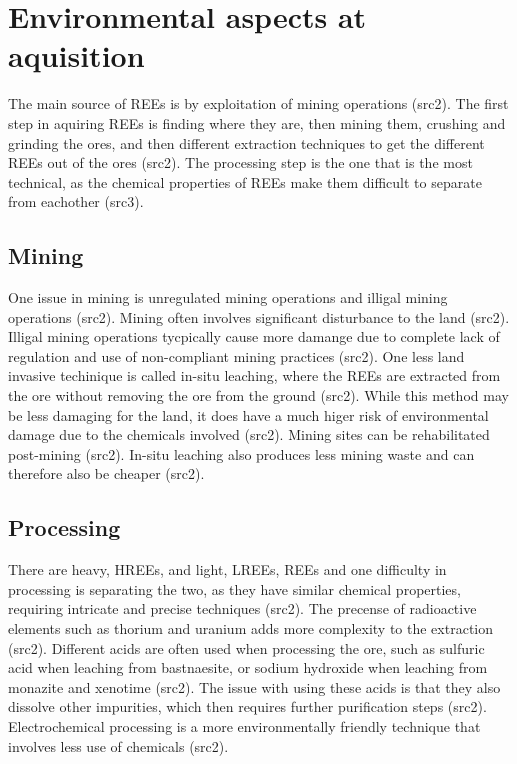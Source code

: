 
\section{Environmental aspects at aquisition}

The main source of REEs is by exploitation of mining operations (src2). The first step in aquiring REEs is finding where they are, then mining them, crushing and grinding the ores, and then different extraction techniques to get the different REEs out of the ores (src2). The processing step is the one that is the most technical, as the chemical properties of REEs make them difficult to separate from eachother (src3).


\subsection{Mining}

One issue in mining is unregulated mining operations and illigal mining operations (src2). Mining often involves significant disturbance to the land (src2). Illigal mining operations tycpically cause more damange due to complete lack of regulation and use of non-compliant mining practices (src2). One less land invasive techinique is called in-situ leaching, where the REEs are extracted from the ore without removing the ore from the ground (src2). While this method may be less damaging for the land, it does have a much higer risk of environmental damage due to the chemicals involved (src2). Mining sites can be rehabilitated post-mining (src2). In-situ leaching also produces less mining waste and can therefore also be cheaper (src2).

\subsection{Processing}

There are heavy, HREEs, and light, LREEs, REEs and one difficulty in processing is separating the two, as they have similar chemical properties, requiring intricate and precise techniques (src2). The precense of radioactive elements such as thorium and uranium adds more complexity to the extraction (src2). Different acids are often used when processing the ore, such as sulfuric acid when leaching from bastnaesite, or sodium hydroxide when leaching from monazite and xenotime (src2). The issue with using these acids is that they also dissolve other impurities, which then requires further purification steps (src2). Electrochemical processing is a more environmentally friendly technique that involves less use of chemicals (src2).

